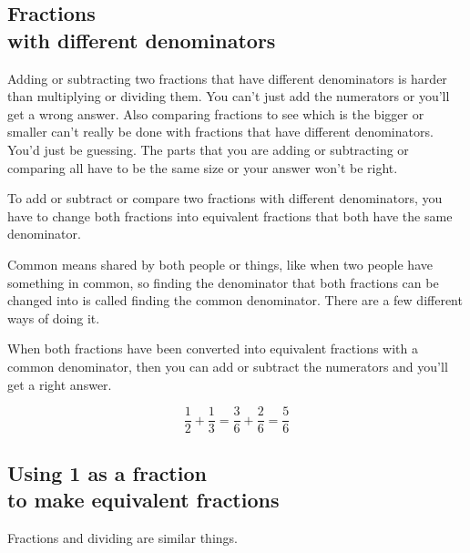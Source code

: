 \documentclass[14pt]{article}
\begin{document}
\begin{enumerate}
\section{Fractions\\with different denominators}
Adding or subtracting two fractions that have different denominators is harder than multiplying or dividing them. You can't just add the numerators or you'll get a wrong answer. Also comparing fractions to see which is the bigger or smaller can’t really be done with fractions that have different denominators. You’d just be guessing. The parts that you are adding or subtracting or comparing all have to be the same size or your answer won’t be right.

To add or subtract or compare two fractions with different denominators, you have to change both fractions into equivalent fractions that both have the same denominator.

Common means shared by both people or things, like when two people have something in common, so finding the denominator that both fractions can be changed into is called finding the common denominator. There are a few different ways of doing it.

When both fractions have been converted into equivalent fractions with a common denominator, then you can add or subtract the numerators and you’ll get a right answer.\\


$$\frac{1}{2} + \frac{1}{3} = \frac{3}{6} + \frac{2}{6} = \frac{5}{6}$$

\subsection*{Using 1 as a fraction\\to make equivalent fractions}
Fractions and dividing are similar things.


\end{enumerate}
\end{document}
